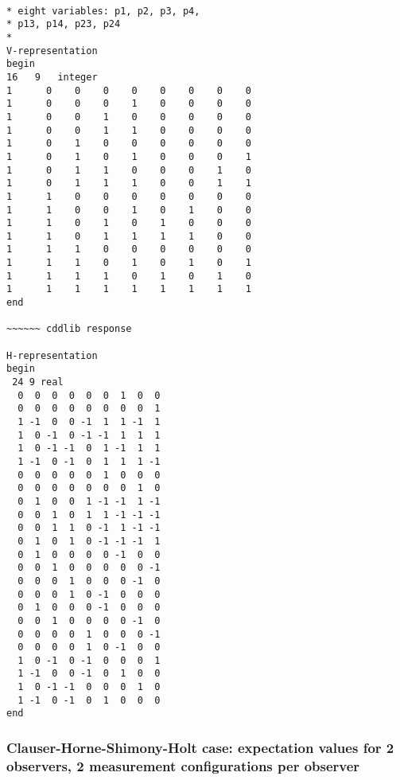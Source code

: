 \documentclass[%
 showpacs,
 showkeys,
 preprintnumbers,
 amsmath,amssymb,
 aps,
  pra,
  longbibliography,
 floatfix,
 ]{revtex4-1}
\begin{document}
{ \begin{lstlisting}[backgroundcolor=\color{yellow!10},framerule=0pt,breaklines=true, frame=tb]

* eight variables: p1, p2, p3, p4,
* p13, p14, p23, p24
*
V-representation
begin
16   9   integer
1      0    0    0    0    0    0    0    0
1      0    0    0    1    0    0    0    0
1      0    0    1    0    0    0    0    0
1      0    0    1    1    0    0    0    0
1      0    1    0    0    0    0    0    0
1      0    1    0    1    0    0    0    1
1      0    1    1    0    0    0    1    0
1      0    1    1    1    0    0    1    1
1      1    0    0    0    0    0    0    0
1      1    0    0    1    0    1    0    0
1      1    0    1    0    1    0    0    0
1      1    0    1    1    1    1    0    0
1      1    1    0    0    0    0    0    0
1      1    1    0    1    0    1    0    1
1      1    1    1    0    1    0    1    0
1      1    1    1    1    1    1    1    1
end

~~~~~~ cddlib response

H-representation
begin
 24 9 real
  0  0  0  0  0  0  1  0  0
  0  0  0  0  0  0  0  0  1
  1 -1  0  0 -1  1  1 -1  1
  1  0 -1  0 -1 -1  1  1  1
  1  0 -1 -1  0  1 -1  1  1
  1 -1  0 -1  0  1  1  1 -1
  0  0  0  0  0  1  0  0  0
  0  0  0  0  0  0  0  1  0
  0  1  0  0  1 -1 -1  1 -1
  0  0  1  0  1  1 -1 -1 -1
  0  0  1  1  0 -1  1 -1 -1
  0  1  0  1  0 -1 -1 -1  1
  0  1  0  0  0  0 -1  0  0
  0  0  1  0  0  0  0  0 -1
  0  0  0  1  0  0  0 -1  0
  0  0  0  1  0 -1  0  0  0
  0  1  0  0  0 -1  0  0  0
  0  0  1  0  0  0  0 -1  0
  0  0  0  0  1  0  0  0 -1
  0  0  0  0  1  0 -1  0  0
  1  0 -1  0 -1  0  0  0  1
  1 -1  0  0 -1  0  1  0  0
  1  0 -1 -1  0  0  0  1  0
  1 -1  0 -1  0  1  0  0  0
end

\end{lstlisting}  }


\subsubsection{Clauser-Horne-Shimony-Holt case: expectation values for 2 observers, 2 measurement configurations per observer}
\label{2017-b-chshcevta}
\end{document}
